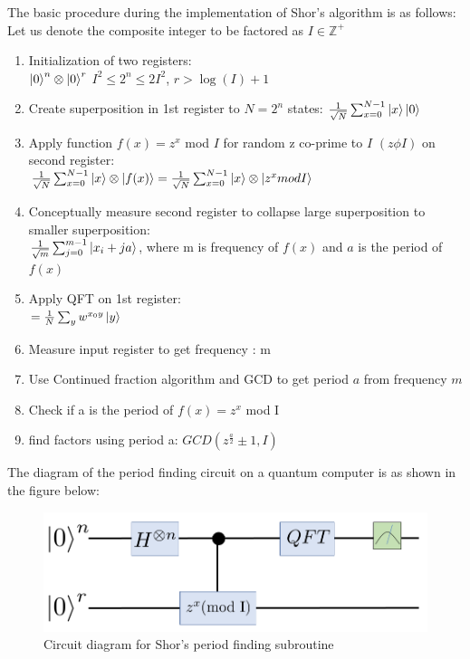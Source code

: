 The basic procedure during the implementation of Shor's algorithm is as follows:
Let us denote the composite integer to be factored as $I \in \mathbb{Z}^+$
\begin{enumerate}
\item Initialization of two registers:
    \\$\ket{0}^n \otimes \ket{0}^r$
    $I^2 \leq 2^n \leq 2I^2$, $r > \log(I) + 1$
    \item Create superposition in 1st register to $N=2^n$ states: $\frac{1}{\sqrt{N}} \sum_{x=0} ^{N-1} \ket{x} \ket{0}$
    \item Apply function $f(x) = z^x$ mod $I$ for random z co-prime to $I$ $(z \phi I)$ on second register:
    \\$\frac{1}{\sqrt{N}} \sum_{x=0} ^{N-1} \ket{x} \otimes \ket{f(x)} = \frac{1}{\sqrt{N}} \sum_{x=0} ^{N-1} \ket{x} \otimes \ket{z^x mod I}$
\item Conceptually measure second register to collapse large superposition to smaller superposition: 
    \\$\frac{1}{\sqrt{m}} \sum_{j=0} ^{m-1} \ket{x_i + ja}$, where m is frequency of $f(x)$ and $a$ is the period of $f(x)$
\item Apply QFT on 1st register:
    \\$= \frac{1}{N} \sum_y w^{x_0 y} \ket{y}$
\item Measure input register to get frequency : m
\item Use Continued fraction algorithm and GCD to get period $a$ from frequency $m$
\item Check if a is the period of $f(x) = z^x$ mod I 
\item find factors using period a: $GCD(z^\frac{a}{2}
    \pm 1, I)$
\end{enumerate}

The diagram of the period finding circuit on a quantum computer is as shown in the figure below:
\begin{figure}[h!]
 \centering
 \includegraphics[scale=0.5]{figures/Shor_period_algorithm_circuit.PNG}
 \caption{Circuit diagram for Shor's period finding subroutine}
 \label{fig: period_finding_circuit}
\end{figure}
